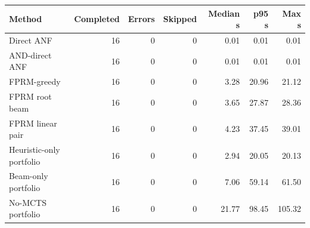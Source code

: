\begin{tabular}{lrrrrrr}
\toprule
Method & Completed & Errors & Skipped & Median s & p95 s & Max s \\
\midrule
Direct ANF & 16 & 0 & 0 & 0.01 & 0.01 & 0.01 \\
AND-direct ANF & 16 & 0 & 0 & 0.01 & 0.01 & 0.01 \\
FPRM-greedy & 16 & 0 & 0 & 3.28 & 20.96 & 21.12 \\
FPRM root beam & 16 & 0 & 0 & 3.65 & 27.87 & 28.36 \\
FPRM linear pair & 16 & 0 & 0 & 4.23 & 37.45 & 39.01 \\
Heuristic-only portfolio & 16 & 0 & 0 & 2.94 & 20.05 & 20.13 \\
Beam-only portfolio & 16 & 0 & 0 & 7.06 & 59.14 & 61.50 \\
No-MCTS portfolio & 16 & 0 & 0 & 21.77 & 98.45 & 105.32 \\
\bottomrule
\end{tabular}
